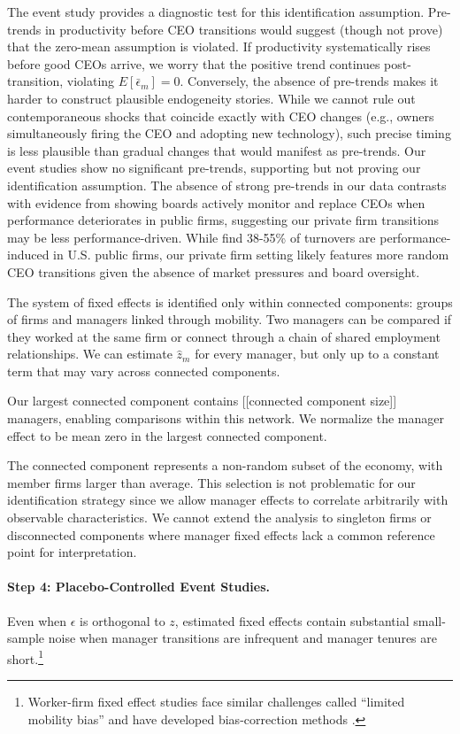 \documentclass[11pt,a4paper]{article}
\begin{document}
The event study provides a diagnostic test for this identification assumption. Pre-trends in productivity before CEO transitions would suggest (though not prove) that the zero-mean assumption is violated. If productivity systematically rises before good CEOs arrive, we worry that the positive trend continues post-transition, violating $E[\bar{\epsilon}_m] = 0$. Conversely, the absence of pre-trends makes it harder to construct plausible endogeneity stories. While we cannot rule out contemporaneous shocks that coincide exactly with CEO changes (e.g., owners simultaneously firing the CEO and adopting new technology), such precise timing is less plausible than gradual changes that would manifest as pre-trends. Our event studies show no significant pre-trends, supporting but not proving our identification assumption. The absence of strong pre-trends in our data contrasts with evidence from \citet{cornelli2013monitoring} showing boards actively monitor and replace CEOs when performance deteriorates in public firms, suggesting our private firm transitions may be less performance-driven. While \citet{jenter2021performance} find 38-55\% of turnovers are performance-induced in U.S. public firms, our private firm setting likely features more random CEO transitions given the absence of market pressures and board oversight.

The system of fixed effects is identified only within connected components: groups of firms and managers linked through mobility. Two managers can be compared if they worked at the same firm or connect through a chain of shared employment relationships. We can estimate $\hat z_m$ for every manager, but only up to a constant term that may vary across connected components. 


Our largest connected component contains [[connected component size]] managers, enabling comparisons within this network. We normalize the manager effect to be mean zero in the largest connected component.

The connected component represents a non-random subset of the economy, with member firms larger than average. This selection is not problematic for our identification strategy since we allow manager effects to correlate arbitrarily with observable characteristics. We cannot extend the analysis to singleton firms or disconnected components where manager fixed effects lack a common reference point for interpretation.

\paragraph{Step 4: Placebo-Controlled Event Studies.} Even when $\epsilon$ is orthogonal to $z$, estimated fixed effects contain substantial small-sample noise when manager transitions are infrequent and manager tenures are short.\footnote{Worker-firm fixed effect studies face similar challenges called ``limited mobility bias'' \citep{andrews2008high} and have developed bias-correction methods \citep{Bonhomme2023-dx, gaure2014correlation}.}
\end{document}
